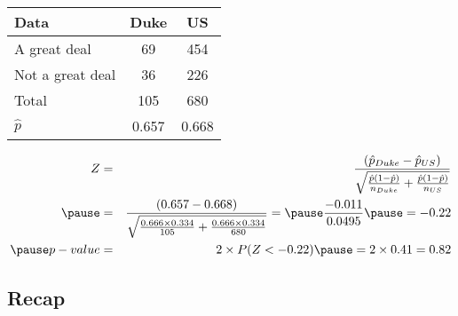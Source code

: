 \documentclass[slidestop,compress,mathserif]{beamer}
\newcommand{\soln}[1]{\textit{#1}}
\begin{document}
\begin{frame}
\frametitle{}


{\footnotesize
\begin{center}
\begin{tabular}{l | c c}
Data			& Duke		& US \\
\hline
A great deal	& 69			& 454 \\
Not a great deal& 36			& 226 \\
\hline
Total			& 105		& 680 \\
\hline
$\hat{p}$		& 0.657		& 0.668
\end{tabular}
\end{center}
}

\pause

\soln{
\begin{eqnarray*}
Z &=& \frac{(\hat{p}_{Duke} - \hat{p}_{US})}{\sqrt{ \frac{ \hat{p} (1 - \hat{p})}{n_{Duke} } + \frac{ \hat{p} (1 -  \hat{p})}{n_{US} } }} \\
\pause 
&=& \frac{(0.657 - 0.668)}{\sqrt{ \frac{0.666 \times 0.334}{105} + \frac{0.666 \times 0.334}{680} }} = \pause \frac{-0.011}{0.0495} \pause = -0.22 \\
\pause
p-value &=& 2 \times P(Z < -0.22) \pause = 2 \times 0.41 = 0.82
\end{eqnarray*}
}

\end{frame}


\subsection{Recap}

\end{document}
